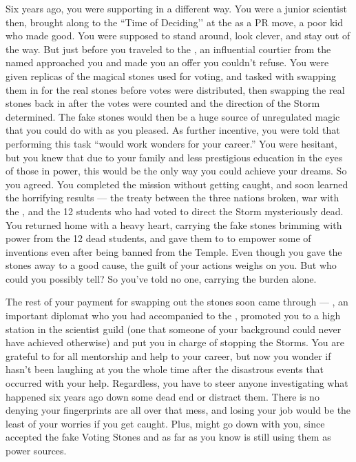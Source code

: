 \documentclass[char]{GL2020}
\begin{document}
Six years ago, you were supporting \cChupInventor{} in a different way. You were a junior scientist then, brought along to the ``Time of Deciding’’ at the \pSchool{} as a PR move, a poor kid who made good. You were supposed to stand around, look clever, and stay out of the way. But just before you traveled to the \pSc{}, an influential courtier from the \pFarm{} named \cEvil{\full} approached you and made you an offer you couldn't refuse. You were given replicas of the magical stones used for voting, and tasked with swapping them in for the real stones before votes were distributed, then swapping the real stones back in after the votes were counted and the direction of the Storm determined. The fake stones would then be a huge source of unregulated magic that you could do with as you pleased. As further incentive, you were told that performing this task ``would work wonders for your career.'' You were hesitant, but you knew that due to your family and less prestigious education in the eyes of those in power, this would be the only way you could achieve your dreams. So you agreed. You completed the mission without getting caught, and soon learned the horrifying results — the treaty between the three nations broken, war with the \pShip{}, and the 12 students who had voted to direct the Storm mysteriously dead. You returned home with a heavy heart, carrying the fake stones brimming with power from the 12 dead students, and gave them to \cChupInventor{} to empower some of \cChupInventor{\their} inventions even after being banned from the Temple. Even though you gave the stones away to a good cause, the guilt of your actions weighs on you. But who could you possibly tell? So you've told no one, carrying the burden alone.

The rest of your payment for swapping out the stones soon came through — \cDiplomat{\full}, an important \pTech{} diplomat who you had accompanied to the \pSchool{}, promoted you to a high station in the scientist guild (one that someone of your background could never have achieved otherwise) and put you in charge of stopping the Storms. You are grateful to \cDiplomat{} for all \cDiplomat{\their} mentorship and help to your career, but now you wonder if \cEvil{} hasn’t been laughing at you the whole time after the disastrous events that occurred with your help. Regardless, you have to steer anyone investigating what happened six years ago down some dead end or distract them. There is no denying your fingerprints are all over that mess, and losing your job would be the least of your worries if you get caught. Plus, \cChupInventor{} might go down with you, since \cChupInventor{\they} accepted the fake Voting Stones and as far as you know is still using them as power sources.
\end{document}
